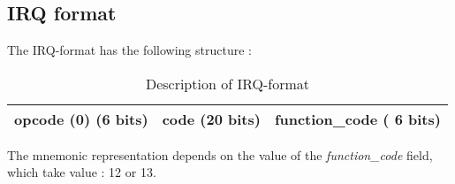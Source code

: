 \subsection*{IRQ format}

	The IRQ-format has the following structure :
	\begin{table}[H]
		\centering
		\begin{tabular}{|c|c|c|}
		\hline 
		opcode (0) (6 bits) & code (20 bits) & function\_code ( 6 bits) \\ 
		\hline 
		\end{tabular} 
		\caption{Description of IRQ-format}
	\end{table}
	
	The mnemonic representation depends on the value of the \textit{function\_code} field, which take value : 12 or 13.